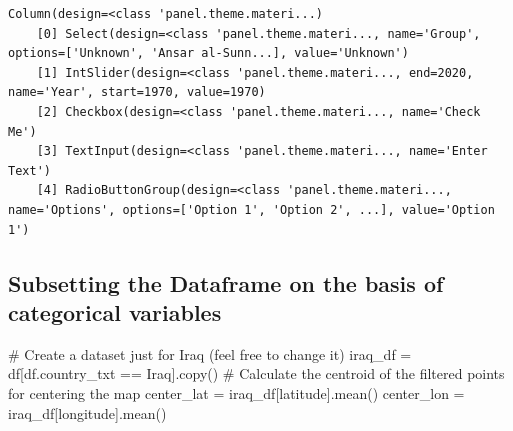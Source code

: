 \documentclass[
  letterpaper,
  DIV=11,
  numbers=noendperiod]{scrreprt}
\newenvironment{Shaded}{\begin{snugshade}}{\end{snugshade}}
\newcommand{\CommentTok}[1]{\textcolor[rgb]{0.37,0.37,0.37}{#1}}
\newcommand{\NormalTok}[1]{\textcolor[rgb]{0.00,0.23,0.31}{#1}}
\newcommand{\OperatorTok}[1]{\textcolor[rgb]{0.37,0.37,0.37}{#1}}
\newcommand{\StringTok}[1]{\textcolor[rgb]{0.13,0.47,0.30}{#1}}
\begin{document}
\begin{verbatim}
Column(design=<class 'panel.theme.materi...)
    [0] Select(design=<class 'panel.theme.materi..., name='Group', options=['Unknown', 'Ansar al-Sunn...], value='Unknown')
    [1] IntSlider(design=<class 'panel.theme.materi..., end=2020, name='Year', start=1970, value=1970)
    [2] Checkbox(design=<class 'panel.theme.materi..., name='Check Me')
    [3] TextInput(design=<class 'panel.theme.materi..., name='Enter Text')
    [4] RadioButtonGroup(design=<class 'panel.theme.materi..., name='Options', options=['Option 1', 'Option 2', ...], value='Option 1')
\end{verbatim}

\hypertarget{subsetting-the-dataframe-on-the-basis-of-categorical-variables}{%
\subsection{Subsetting the Dataframe on the basis of categorical
variables}\label{subsetting-the-dataframe-on-the-basis-of-categorical-variables}}

\begin{Shaded}
\begin{Highlighting}[]
\CommentTok{\# Create a dataset just for Iraq (feel free to change it)}
\NormalTok{iraq\_df }\OperatorTok{=}\NormalTok{ df[df.country\_txt }\OperatorTok{==} \StringTok{\textquotesingle{}Iraq\textquotesingle{}}\NormalTok{].copy()}
\CommentTok{\# Calculate the centroid of the filtered points for centering the map}
\NormalTok{center\_lat }\OperatorTok{=}\NormalTok{ iraq\_df[}\StringTok{\textquotesingle{}latitude\textquotesingle{}}\NormalTok{].mean()}
\NormalTok{center\_lon }\OperatorTok{=}\NormalTok{ iraq\_df[}\StringTok{\textquotesingle{}longitude\textquotesingle{}}\NormalTok{].mean()}
\end{Highlighting}
\end{Shaded}
\end{document}
